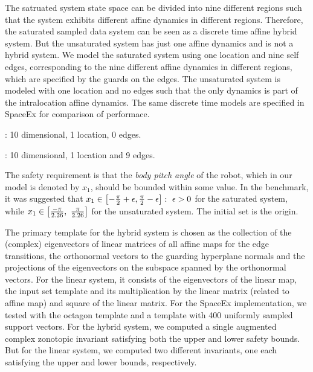 
The satruated system state space can be divided into nine different
regions such that the system exhibits different affine dynamics in
different regions.  Therefore, the saturated sampled data system can
be seen as a discrete time affine hybrid system.  But the unsaturated
system has just one affine dynamics and is not a hybrid system.  We
model the saturated system using one location and nine self edges,
corresponding to the nine different affine dynamics in different
regions, which are specified by the guards on the edges.  The
unsaturated system is modeled with one location and no edges such that
the only dynamics is part of the intralocation affine dynamics.  The
same discrete time models are specified in SpaceEx for comparison of
performace.

: 10 dimensional, 1 location, 0 edges.

: 10 dimensional, 1 location and 9 edges.

The safety requirement is that the \emph{body pitch angle} of the
robot, which in our model is denoted by $x_1$, should be bounded
within some value. In the benchmark, it was suggested that
$x_1\in\left[-\frac{\pi}{2}+\epsilon,\frac{\pi}{2}-\epsilon\right]:~\epsilon>0$
for the saturated system, while
$x_1\in\left[\frac{-\pi}{2.26},~\frac{\pi}{2.26}\right]$ for the
unsaturated system. The initial set is the origin.

  The primary template for the hybrid system is
chosen as the collection of the (complex) eigenvectors of linear
matrices of all affine maps for the edge transitions, the orthonormal
vectors to the guarding hyperplane normals and the projections of the
eigenvectors on the subspace spanned by the orthonormal vectors.  For
the linear system, it consists of the eigenvectors of the linear map,
the input set template and its multiplication by the linear matrix
(related to affine map) and square of the linear matrix.  For the
SpaceEx implementation, we tested with the octagon template and a
template with 400 uniformly sampled support vectors.  For the hybrid
system, we computed a single augmented complex zonotopic invariant
satisfying both the upper and lower safety bounds.  But for the linear
system, we computed two different invariants, one each satisfying the
upper and lower bounds, respectively.


